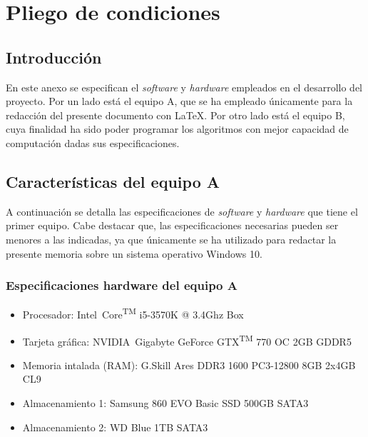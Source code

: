 \chapter{Pliego de condiciones}
\label{cha:pliego-de-condiciones}

\section{Introducción}
\label{sec:intro-pliego}

En este anexo se especifican el \textit{software} y \textit{hardware} empleados en el desarrollo del proyecto. Por un lado está el equipo A, que se ha empleado únicamente para la redacción del presente documento con \LaTeX. Por otro lado está el equipo B, cuya finalidad ha sido poder programar los algoritmos con mejor capacidad de computación dadas sus especificaciones.

\section{Características del equipo A}
\label{sec:caracteristicas-equipoa}

A continuación se detalla las especificaciones de \textit{software} y \textit{hardware} que tiene el primer equipo. Cabe destacar que, las especificaciones necesarias pueden ser menores a las indicadas, ya que únicamente se ha utilizado para redactar la presente memoria sobre un sistema operativo Windows 10.

\subsection{Especificaciones hardware del equipo A}
\label{subsec:especificaciones-hardware-equipoa}
\begin{itemize}
    \item Procesador: Intel\textregistered\ Core\textsuperscript{TM} i5-3570K @ 3.4Ghz Box
    \item Tarjeta gráfica: NVIDIA\textregistered\ Gigabyte GeForce GTX\textsuperscript{TM} 770 OC 2GB GDDR5
    \item Memoria intalada (RAM): G.Skill Ares DDR3 1600 PC3-12800 8GB 2x4GB CL9
    \item Almacenamiento 1: Samsung 860 EVO Basic SSD 500GB SATA3
    \item Almacenamiento 2: WD Blue 1TB SATA3
\end{itemize}

